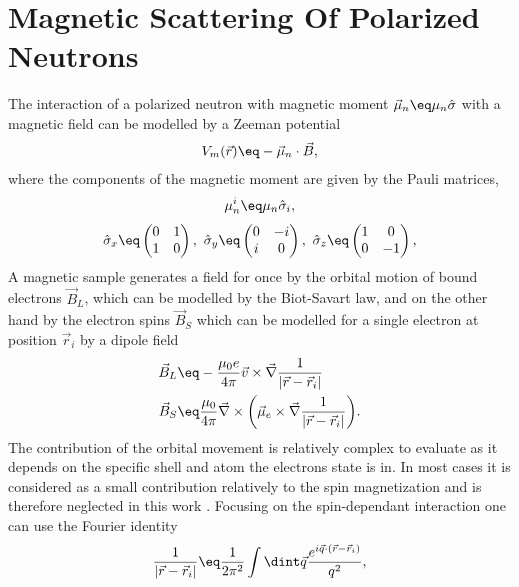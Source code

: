 \documentclass[\main/dresen_thesis.tex]{subfiles}
\begin{document}
\section{Magnetic Scattering Of Polarized Neutrons}\label{ch:appendix:calculations:magneticScatteringTheory}
The interaction of a polarized neutron with magnetic moment $\vec{\mu}_n \eq \mu_n \hat{\sigma}$ with a magnetic field can be modelled by a Zeeman potential
\begin{align}
  V_m (\vec{r}) \eq - \vec{\mu}_n \cdot \vec{B},
\end{align}
where the components of the magnetic moment are given by the Pauli matrices,
\begin{align}
  \mu_n^i \eq \mu_n \hat{\sigma}_i,
\end{align}
\begin{align}
  \hat{\sigma}_x \eq \begin{pmatrix} 0 & 1 \\1 & 0 \end{pmatrix},\,\,
  \hat{\sigma}_y \eq \begin{pmatrix} 0 & -i \\i & 0 \end{pmatrix},\,\,
  \hat{\sigma}_z \eq \begin{pmatrix} 1 & 0 \\0 & -1 \end{pmatrix},
\end{align}
A magnetic sample generates a field for once by the orbital motion of bound electrons $\vec{B}_L$, which can be modelled by the Biot-Savart law, and on the other hand by the electron spins $\vec{B}_S$ which can be modelled for a single electron at position $\vec{r}_i$ by a dipole field
\begin{align}
  \vec{B}_L \eq& -\frac{\mu_0 e}{4 \pi} \vec{v} \times \vec{\nabla} \frac{ 1}{|\vec{r} - \vec{r}_i|}\\
  \vec{B}_S \eq& \frac{\mu_0}{4\pi} \vec{\nabla} \times \biggl(\vec{\mu}_e \times \vec{\nabla} \frac{ 1}{|\vec{r} - \vec{r}_i|} \biggr).
\end{align}
The contribution of the orbital movement is relatively complex to evaluate as it depends on the specific shell and atom the electrons state is in.
In most cases it is considered as a small contribution relatively to the spin magnetization and is therefore neglected in this work \cite{Zhu_2005_Moder}.
Focusing on the spin-dependant interaction one can use the Fourier identity
\begin{align}
   \frac{1}{|\vec{r} - \vec{r}_i|} \eq \frac{1}{2 \pi^2} \int \dint \vec{q} \frac{e^{i \vec{q} \cdot (\vec{r} - \vec{r}_i)}}{q^2},
\end{align}
\end{document}
